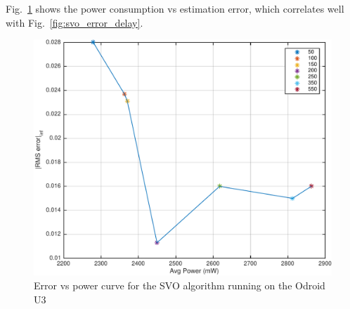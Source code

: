 Fig.~\ref{fig:svoErrVsPower} shows the power consumption vs estimation error, which correlates well with Fig.~\ref{fig:svo_error_delay}.
\begin{figure}[t]
	\centering
	\includegraphics[width=0.9\columnwidth]{figures/errVsPower}
	\caption{Error vs power curve for the SVO algorithm running on the Odroid U3}
	\label{fig:svoErrVsPower}
\end{figure}
